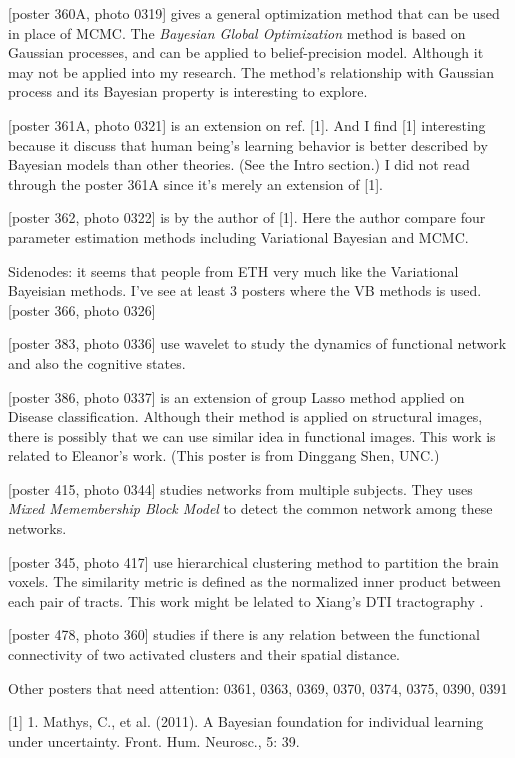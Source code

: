 \documentclass[12pt]{article}
\begin{document}
[poster 360A, photo 0319] gives a general optimization method that can be used in place of MCMC. The \emph{Bayesian Global Optimization} method is based on Gaussian processes, and can be applied to belief-precision model. Although it may not be applied into my research. The method's relationship with Gaussian process and its Bayesian property is interesting to explore.

[poster 361A, photo 0321] is an extension on ref. [1]. And I find [1] interesting because it discuss that human being's learning behavior is better described by Bayesian models than other theories. (See the Intro section.) I did not read through the poster 361A since it's merely an extension of [1].

[poster 362, photo 0322] is by the author of [1]. Here the author compare four parameter estimation methods including Variational Bayesian and MCMC. 

Sidenodes: it seems that people from ETH very much like the Variational Bayeisian methods. I've see at least 3 posters where the VB methods is used. [poster 366, photo 0326]

[poster 383, photo 0336] use wavelet to study the dynamics of functional network and also the cognitive states.

[poster 386, photo 0337] is an extension of group Lasso method applied on Disease classification. Although their method is applied on structural images, there is possibly that we can use similar idea in functional images. This work is related to Eleanor's work. (This poster is from Dinggang Shen, UNC.)

[poster 415, photo 0344] studies networks from multiple subjects. They uses \emph{Mixed Memembership Block Model} to detect the common network among these networks.

[poster 345, photo 417] use hierarchical clustering method to partition the brain voxels. The similarity metric is defined as the normalized inner product between each pair of tracts.  This work might be lelated to Xiang's DTI tractography .

[poster 478, photo 360] studies if there is any relation between the functional connectivity of two activated clusters and their spatial distance.

Other posters that need attention: 0361, 0363, 0369, 0370, 0374, 0375, 0390, 0391


[1] 1. Mathys, C., et al. (2011). A Bayesian foundation for individual learning under uncertainty. Front. Hum. Neurosc., 5: 39.

 

\end{document}
